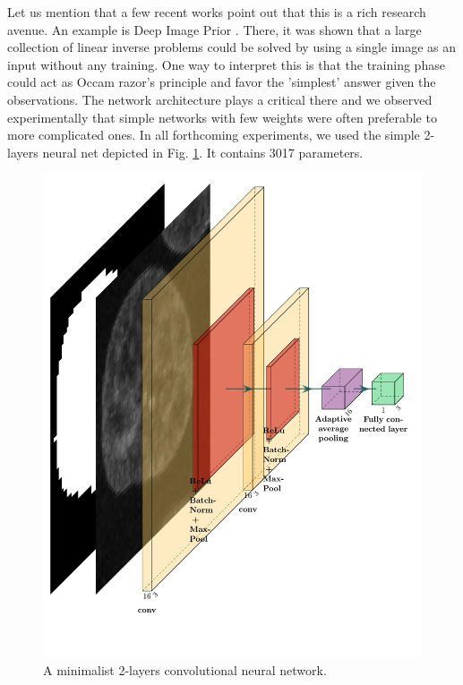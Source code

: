 \documentclass{article}
\begin{document}
Let us mention that a few recent works point out that this is a rich research avenue. 
An example is Deep Image Prior \cite{lempitsky2018deep}. 
There, it was shown that a large collection of linear inverse problems could be solved by using a single image as an input without any training. 
One way to interpret this is that the training phase could act as Occam razor's principle and favor the 'simplest' answer given the observations.
The network architecture plays a critical there and we observed experimentally that simple networks with few weights were often preferable to more complicated ones.
In all forthcoming experiments, we used the simple 2-layers neural net depicted in Fig. \ref{fig:CNN2D}. It contains 3017 parameters.
\begin{figure}[h!]{}
 \centering
 \includegraphics[width=0.8\linewidth]{Figures/myfirstcnn.pdf}
  \caption{A minimalist 2-layers convolutional neural network. \label{fig:CNN2D}}
\end{figure}



\end{document}
